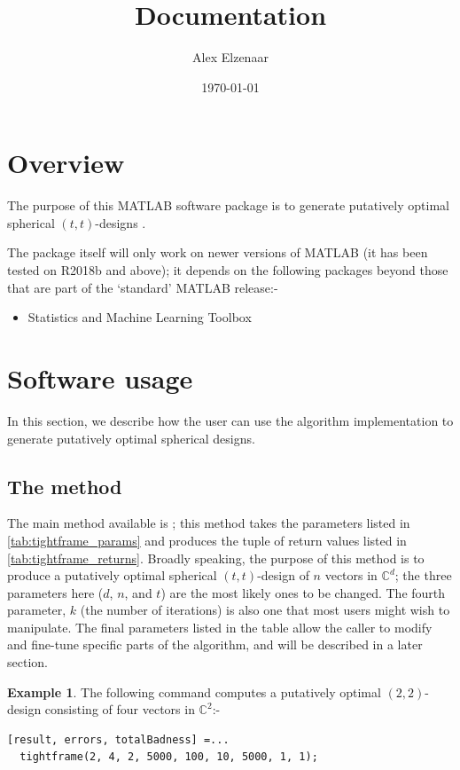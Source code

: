 \documentclass{article}
\title{Documentation}
\author{Alex Elzenaar}
\date{\today}
\newcommand{\C}{\mathbb{C}}
\theoremstyle{definition}
\newtheorem{ex}{Example}
\begin{document}
  \maketitle

  \tableofcontents

  \section{Overview}
  The purpose of this MATLAB software package is to generate putatively optimal
  spherical $(t,t)$-designs \autocite{waldron2018}.

  The package itself will only work on newer versions of MATLAB (it has been tested
  on R2018b and above); it depends on the following packages beyond those that are
  part of the `standard' MATLAB release:-
  \begin{itemize}
    \item Statistics and Machine Learning Toolbox
  \end{itemize}

  \section{Software usage}
  In this section, we describe how the user can use the algorithm implementation to generate
  putatively optimal spherical designs.

  \subsection{The  method}  
  The main method available is ; this method takes the parameters
  listed in \cref{tab:tightframe_params} and produces the tuple of return values listed
  in \cref{tab:tightframe_returns}. Broadly speaking, the purpose of this method is to
  produce a putatively optimal spherical $(t,t)$-design of $ n $ vectors in $ \C^d $; the
  three parameters here ($ d $, $ n $, and $ t $) are the most likely ones to be changed.
  The fourth parameter, $ k $ (the number of iterations) is also one that most users might
  wish to manipulate. The final parameters listed in the table allow the caller
  to modify and fine-tune specific parts of the algorithm, and will be described in a later section.

  \begin{ex}\label{ex:dnt_2_4_2}
    The following command computes a putatively optimal $ (2,2)$-design consisting of four vectors in $ \C^2 $:-
    \begin{lstlisting}
[result, errors, totalBadness] =...
  tightframe(2, 4, 2, 5000, 100, 10, 5000, 1, 1);
    \end{lstlisting}
  \end{ex}
\end{document}
